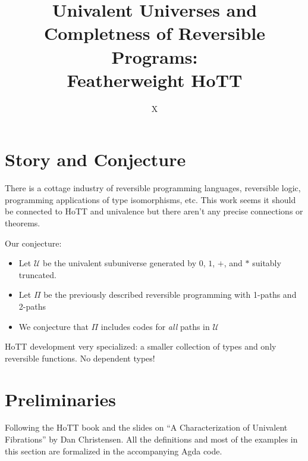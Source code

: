 \documentclass[format=acmlarge,review,natbib]{acmart}
\begin{document}
\title[Featherweight HoTT]{Univalent Universes and Completness of Reversible Programs: \\
  Featherweight HoTT}

\author{X}

\begin{abstract}
\end{abstract}

\maketitle

\section{Story and Conjecture}

There is a cottage industry of reversible programming languages, reversible logic, programming applications of type isomorphisms, etc. This work seems it should be connected to HoTT and univalence but there aren't any precise connections or theorems.

Our conjecture:

\begin{itemize}
\item Let $\mathcal{U}$ be the univalent subuniverse generated by $0$, $1$, $+$,
  and $*$ suitably truncated.
\item Let $\Pi$ be the previously  described reversible programming with 1-paths and 2-paths
\item We conjecture that $\Pi$ includes codes for \emph{all} paths in $\mathcal{U}$
\end{itemize}

HoTT development very specialized: a smaller collection of types and only
reversible functions. No dependent types!

\section{Preliminaries}

Following the HoTT book and the slides on ``A Characterization of Univalent
Fibrations'' by Dan Christensen. All the definitions and most of the examples in
this section are formalized in the accompanying Agda code.
\end{document}
